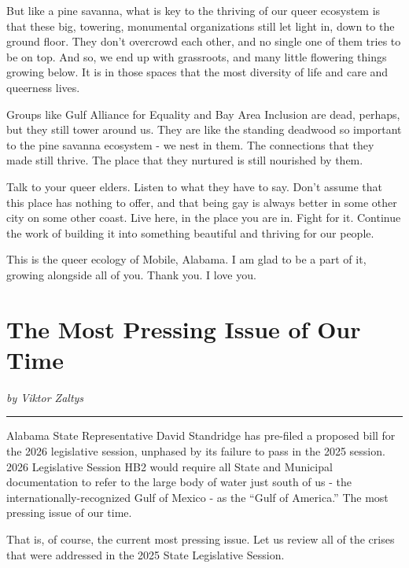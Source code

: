 \documentclass[
]{book}
\begin{document}
But like a pine savanna, what is key to the thriving of our queer ecosystem is that these big, towering, monumental organizations still let light in, down to the ground floor. They don't overcrowd each other, and no single one of them tries to be on top. And so, we end up with grassroots, and many little flowering things growing below. It is in those spaces that the most diversity of life and care and queerness lives.

Groups like Gulf Alliance for Equality and Bay Area Inclusion are dead, perhaps, but they still tower around us. They are like the standing deadwood so important to the pine savanna ecosystem - we nest in them. The connections that they made still thrive. The place that they nurtured is still nourished by them.

Talk to your queer elders. Listen to what they have to say. Don't assume that this place has nothing to offer, and that being gay is always better in some other city on some other coast. Live here, in the place you are in. Fight for it. Continue the work of building it into something beautiful and thriving for our people.

This is the queer ecology of Mobile, Alabama. I am glad to be a part of it, growing alongside all of you. Thank you. I love you.

\section*{The Most Pressing Issue of Our Time}\label{the-most-pressing-issue-of-our-time}

\emph{by Viktor Zaltys}

\begin{center}\rule{0.5\linewidth}{0.5pt}\end{center}

Alabama State Representative David Standridge has pre-filed a proposed bill for the 2026 legislative session, unphased by its failure to pass in the 2025 session. 2026 Legislative Session HB2 would require all State and Municipal documentation to refer to the large body of water just south of us - the internationally-recognized Gulf of Mexico - as the ``Gulf of America.'' The most pressing issue of our time.

That is, of course, the current most pressing issue. Let us review all of the crises that were addressed in the 2025 State Legislative Session.
\end{document}
